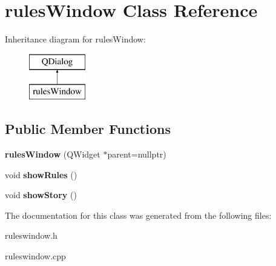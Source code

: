 \hypertarget{classrules_window}{\section{rules\-Window Class Reference}
\label{classrules_window}
}
Inheritance diagram for rules\-Window\-:\begin{figure}[H]
\begin{center}
\leavevmode
\includegraphics[height=2.000000cm]{classrules_window}
\end{center}
\end{figure}
\subsection*{Public Member Functions}
\begin{DoxyCompactItemize}
\item 
\hypertarget{classrules_window_ab68d6cd4114f873adf625c953d91480b}{{\bfseries rules\-Window} (Q\-Widget $\ast$parent=nullptr)}\label{classrules_window_ab68d6cd4114f873adf625c953d91480b}

\item 
\hypertarget{classrules_window_ab15704667d1b4e8f85f9ab30ddc649ae}{void {\bfseries show\-Rules} ()}\label{classrules_window_ab15704667d1b4e8f85f9ab30ddc649ae}

\item 
\hypertarget{classrules_window_acbe021b744465bfa0edc382f46c12cdb}{void {\bfseries show\-Story} ()}\label{classrules_window_acbe021b744465bfa0edc382f46c12cdb}

\end{DoxyCompactItemize}


The documentation for this class was generated from the following files\-:\begin{DoxyCompactItemize}
\item 
ruleswindow.\-h\item 
ruleswindow.\-cpp\end{DoxyCompactItemize}
